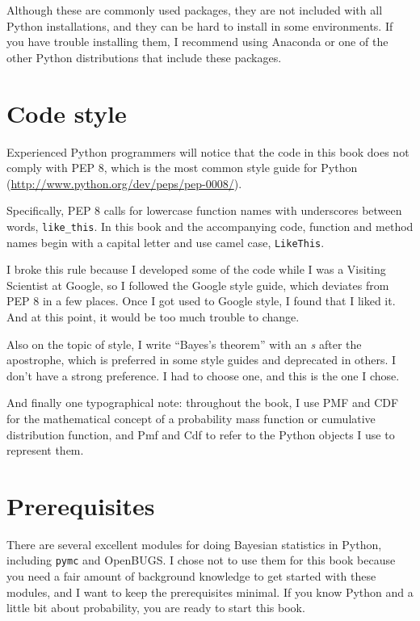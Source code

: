 \documentclass[12pt]{book}
\theoremstyle{exercise}
\begin{document}
Although these are commonly used packages, they are not included with
all Python installations, and they can be hard to install in some
environments.  If you have trouble installing them, I
recommend using Anaconda or one of the other Python distributions
that include these packages.



\section{Code style}

Experienced Python programmers will notice that the code in this
book does not comply with PEP 8, which is the most common
style guide for Python (\url{http://www.python.org/dev/peps/pep-0008/}).

Specifically, PEP 8 calls for lowercase function names with
underscores between words, \verb"like_this".  In this book and
the accompanying code, function and method names begin with
a capital letter and use camel case, \verb"LikeThis".

I broke this rule because I developed some of the code
while I was a Visiting Scientist at Google, so I followed
the Google style guide, which deviates from PEP 8 in a few
places.  Once I got used to Google style, I found that I liked
it.  And at this point, it would be too much trouble to change.

Also on the topic of style, I write ``Bayes's theorem''
with an {\it s} after the apostrophe, which is preferred in some
style guides and deprecated in others.  I don't have a strong
preference.  I had to choose one, and this is the one I chose.

And finally one typographical note: throughout the book, I use
PMF and CDF for the mathematical concept of a probability
mass function or cumulative distribution function, and Pmf and Cdf
to refer to the Python objects I use to represent them.


\section{Prerequisites}

There are several excellent modules for doing Bayesian statistics in
Python, including {\tt pymc} and OpenBUGS.  I chose not to use them
for this book because you need a fair amount of background knowledge
to get started with these modules, and I want to keep the
prerequisites minimal.  If you know Python and a little bit about
probability, you are ready to start this book.
\end{document}

